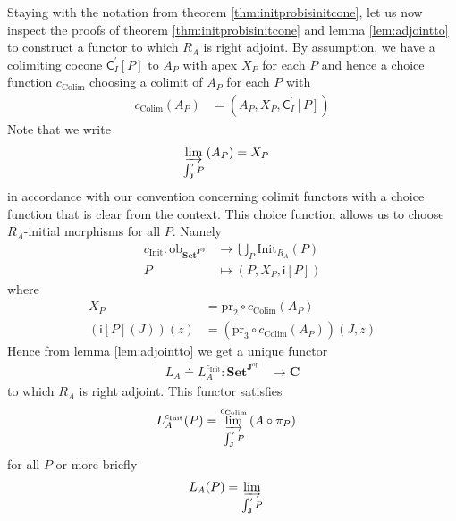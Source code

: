 \begin{cst}
\label{cst:la}
Staying with the notation from theorem \ref{thm:initprobisinitcone}, let us now inspect the proofs of theorem \ref{thm:initprobisinitcone} and lemma \ref{lem:adjointto} to construct a functor to which $R_{A}$ is right adjoint.
By assumption, we have a colimiting cocone $\mathsf{C}_{I}^{\prime}[P]$ to $A_{P}$ with apex $X_{P}$ for each $P$ and hence a choice function $c_{\mathrm{Colim}}$ choosing a colimit of $A_{P}$ for each $P$ with
\begin{align*}
  c_{\mathrm{Colim}}(A_{P})
  &=
  \left(
    A_{P},
    X_{P},
    \mathsf{C}_{I}^{\prime}[P]
  \right)
\end{align*}
Note that we write
\begin{align*}
  \varinjlim_{\int_{\mathbf{J}}^{\prime}P}
  \left(
    A_{P}
  \right)
  &=
  X_{P}
\end{align*}
in accordance with our convention concerning colimit functors with a choice function that is clear from the context.
This choice function allows us to choose $R_{A}$-initial morphisms for all $P$.
Namely
\begin{align*}
  c_{\mathrm{Init}}
  \colon
  \mathrm{ob}_{\mathbf{Set}^{\mathbf{J}^{\textrm{op}}}}
  &\rightarrow
  \bigcup_{P}
  \mathrm{Init}_{R_{A}}(P)
  \\
  P
  &\mapsto
  \left(
    P,
    X_{P},
    \mathsf{i}[P]
  \right)
\end{align*}
where
\begin{align*}
  X_{P}
  &=
  \mathrm{pr}_{2}
  \circ
  c_{\mathrm{Colim}}(A_{P})
  \\
  \left(
    \mathsf{i}[P](J)
  \right)
  (z)
  &=
  \left(
    \mathrm{pr}_{3}
    \circ
    c_{\mathrm{Colim}}(A_{P})
  \right)
  (J,z)
\end{align*}
Hence from lemma \ref{lem:adjointto} we get a unique functor
\begin{align*}
  L_{A}
  \doteq
  L_{A}^{c_{\mathrm{Init}}}
  \colon
  \mathbf{Set}^{\mathbf{J}^{\textrm{op}}}
  &\rightarrow
  \mathbf{C}
\end{align*}
to which $R_{A}$ is right adjoint.
This functor satisfies
\begin{align*}
  L_{A}^{c_{\mathrm{Init}}}(P)
  &=
  \varinjlim_{\int_{\mathbf{J}}^{\prime}P}^{c_{\mathrm{Colim}}}
  \left(
    A
    \circ
    \pi_{P}
  \right)
\end{align*}
for all $P$ or more briefly
\begin{align*}
  L_{A}(P)
  &=
  \varinjlim_{\int_{\mathbf{J}}^{\prime}P}

\end{align*}
\end{cst}
